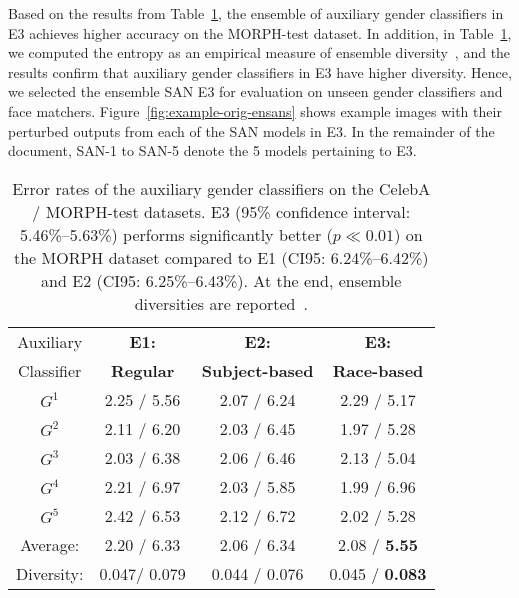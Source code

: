 \documentclass[10pt,twocolumn,letterpaper]{article}
\begin{document}
Based on the results from Table~\ref{tab:ensemble-aux-classifiers}, the ensemble of auxiliary gender classifiers in E3 achieves higher accuracy on the MORPH-test dataset. In addition, in Table~\ref{tab:ensemble-aux-classifiers}, we  computed the  entropy as an empirical measure of ensemble diversity~\cite{kuncheva_combining_2004}, and the results confirm that auxiliary gender classifiers in E3 have higher diversity. Hence, we selected the ensemble SAN E3 for evaluation on unseen gender classifiers and face matchers. Figure~\ref{fig:example-orig-ensans} shows example images with their perturbed outputs from each of the SAN models in E3. In the remainder of the document, SAN-1 to SAN-5 denote the 5 models pertaining to E3. 


\begin{table}
\caption{Error rates of the auxiliary gender classifiers on the CelebA / MORPH-test datasets. E3 (95\% confidence interval: 5.46\%--5.63\%) performs significantly better ($p \ll 0.01$) on the MORPH dataset compared to E1 (CI95: 6.24\%--6.42\%) and E2 (CI95: 6.25\%--6.43\%). At the end, ensemble diversities are reported~\cite{kuncheva_combining_2004}.}
\label{tab:ensemble-aux-classifiers}
\begin{center}
\begin{threeparttable}
\small
\begin{tabular}{cccc}
 \toprule{\small Auxiliary} & {\bf E1:}& {\bf E2:}& {\bf E3:}\\{\small  Classifier} &{\bf \small Regular} & {\bf \small Subject-based} & {\bf \small Race-based} \\ 
\midrule
$G^1$ & 2.25 / 5.56 & 2.07 / 6.24 & 2.29 / 5.17 \\ %
$G^2$ & 2.11 / 6.20 & 2.03 / 6.45 & 1.97 / 5.28 \\ %
$G^3$ & 2.03 / 6.38 & 2.06 / 6.46 & 2.13 / 5.04 \\ %
$G^4$ & 2.21 / 6.97 & 2.03 / 5.85 & 1.99 / 6.96 \\ %
$G^5$ & 2.42 / 6.53 & 2.12 / 6.72 & 2.02 / 5.28 \\ %
\midrule
Average: &  2.20 / 6.33 & 2.06 / 6.34 & 2.08 / \textbf{5.55} \\ 
Diversity: & 0.047/ 0.079 & 0.044 / 0.076 & 0.045 / {\bf 0.083} \\ \bottomrule
\end{tabular}%
\end{threeparttable}
\end{center}
\end{table}
\end{document}
